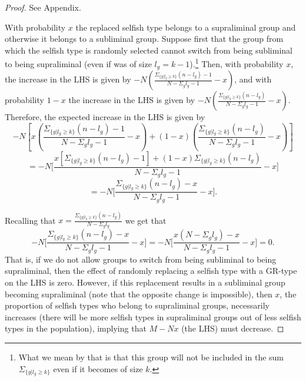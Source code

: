 \documentclass[12pt,a4paper]{article}
\newcommand{\mm}[1]{{\color{red} #1}}
\begin{document}
\begin{proof}
    See Appendix.
    
    \mm{
    With probability $x$ the replaced selfish type belongs to a supraliminal group and otherwise it belongs to a subliminal group.
    Suppose first that the group from which the selfish type is randomly selected cannot switch from being subliminal to being supraliminal (even if was of size $l_g=k-1$).\footnote{\mm{What we mean by that is that this group will not be included in the sum $\Sigma_{\{g|l_g \geq k\}}$ even if it becomes of size $k$.}}
    Then, with probability $x$, the increase in the LHS is given by $-N(\frac{\Sigma_{\{g|l_g \geq k\}}(n-l_g)-1}{N-\Sigma_gl_g-1}-x)$, and with probability $1-x$ the increase in the LHS is given by $-N(\frac{\Sigma_{\{g|l_g \geq k\}}(n-l_g)}{N-\Sigma_gl_g-1}-x)$.
    Therefore, the expected increase in the LHS is given by
    \begin{equation*}
        -N[x(\frac{\Sigma_{\{g|l_g \geq k\}}(n-l_g)-1}{N-\Sigma_gl_g-1}-x)+(1-x)(\frac{\Sigma_{\{g|l_g \geq k\}}(n-l_g)}{N-\Sigma_gl_g-1}-x)] 
    \end{equation*}
    \begin{equation*}
        =-N\big[\frac{x[\Sigma_{\{g|l_g \geq k\}}(n-l_g)-1]+(1-x)\Sigma_{\{g|l_g \geq k\}}(n-l_g)}{N-\Sigma_gl_g-1}-x \big]
    \end{equation*}
    \begin{equation*}
        =-N\big[\frac{\Sigma_{\{g|l_g \geq k\}}(n-l_g)-x}{N-\Sigma_gl_g-1}-x \big].
    \end{equation*}

    Recalling that $x=\frac{\Sigma_{\{g|l_g \geq k\}}(n-l_g)}{N-\Sigma_gl_g}$ we get that
    \begin{equation*}
       -N\big[\frac{\Sigma_{\{g|l_g \geq k\}}(n-l_g)-x}{N-\Sigma_gl_g-1}-x \big]= -N\big[\frac{x(N-\Sigma_gl_g)-x}{N-\Sigma_gl_g-1}-x \big]=0.
    \end{equation*}
   That is, if we do not allow groups to switch from being subliminal to being supraliminal, then the effect of randomly replacing a selfish type with a GR-type on the LHS is zero. However, if this replacement results in a subliminal group becoming supraliminal (note that the opposite change is impossible), then $x$, the proportion of selfish types who belong to supraliminal groups, necessarily increases (there will be more selfish types in supraliminal groups out of less selfish types in the population), implying that $M-Nx$ (the LHS) must decrease.
            }
\end{proof}
\end{document}
